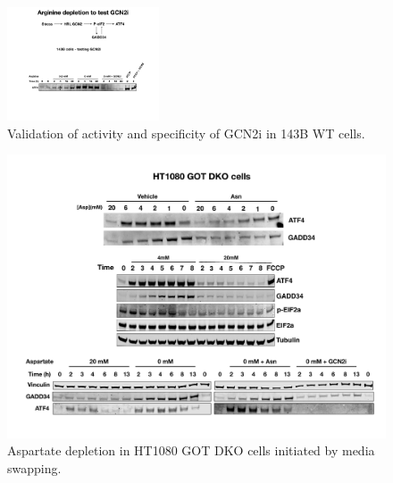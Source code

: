 \begin{figure}
    \centering
    \includegraphics[width=0.40\textwidth]{figures/sapp/ISR/143B_GCN2i_val.pdf}
    \caption[GCN2i validation]{
    Validation of activity and specificity of GCN2i in 143B WT cells.
    }
    \label{fig:sapp:ISR:143B_GCN2i_val}
\end{figure}



\begin{figure}
    \centering
    \includegraphics[height=0.85\textheight]{figures/sapp/ISR/HT1080_DKO_ISR.pdf}
    \caption[Asp depl. induced ISR, HT1080]{
    Aspartate depletion in HT1080 GOT DKO cells initiated by media swapping.
    }
    \label{fig:sapp:ISR:HT1080_DKO_ISR}
\end{figure}

